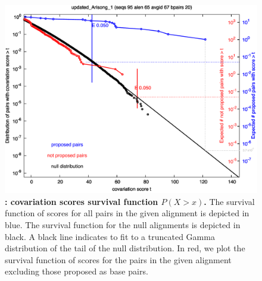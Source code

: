  \begin{figure}[h] \includegraphics[scale=0.50]{Arisong_surv.pdf} 
 \caption{\small\textbf{:
 covariation scores survival function $P(X>x)$.}  The survival
 function of scores for all pairs in the given alignment is depicted
 in blue. The survival function for the null alignments is depicted in
 black. A black line indicates to fit to a truncated Gamma
 distribution of the tail of the null distribution. In red, we plot
 the survival function of scores for the pairs in the given alignment
 excluding those proposed as base
 pairs.}  \label{fig:surv} \end{figure}

